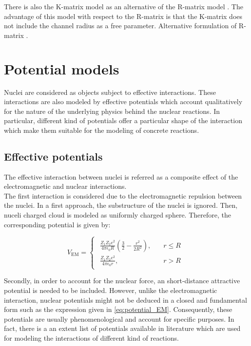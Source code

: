\documentclass[openany]{book}
\begin{document}
There is also the K-matrix model as an alternative of the R-matrix model \cite{humblet_1990}. The advantage of this model with respect to the R-matrix is that the K-matrix does not include the channel radius as a free parameter.  Alternative formulation of R-matrix \cite{brune_2002}.

\section{Potential models} \label{sec:potentialModels}

Nuclei are considered as objects subject to effective interactions. These interactions are also modeled by effective potentials which account qualitatively for the nature of the underlying physics behind the nuclear reactions. In particular, different kind of potentials offer a particular shape of the interaction which make them suitable for the modeling of concrete reactions.

\subsection{Effective potentials} \label{sub:potential_effective}

The effective interaction between nuclei is referred as a composite effect of the electromagnetic and nuclear interactions.  \\

The first interaction is considered due to the electromagnetic repulsion between the nuclei. In a first approach, the  substructure of the nuclei is ignored. Then, nuceli charged cloud is modeled as uniformly charged sphere. Therefore, the corresponding potential is given by:

\begin{equation} \label{eq:potential_EM}
	V_{\mathrm{EM}} = 	\left\{\begin{array}{l}
		\begin{split}
			\frac{Z_1Z_2e^2}{4\pi\epsilon_0R}\left(\frac{3}{2} - \frac{r^2}{2R^2}\right), \quad &r \le R \\ 
			\frac{Z_1Z_2e^2}{4\pi\epsilon_0r}, \quad &r > R	
		\end{split}
	\end{array}\right.
\end{equation}

Secondly, in order to account for the nuclear force, an short-distance attractive potential is needed to be included. However, unlike the electromagnetic interaction, nuclear potentials might not be deduced  in a closed and fundamental form such as the expression given in \ref{eq:potential_EM}. Consequently, these  potentials are usually phenomenological and account for specific purposes. In fact, there is a an extent list of potentials available in literature which are used for modeling the interactions of different kind of reactions. \\
\end{document}
